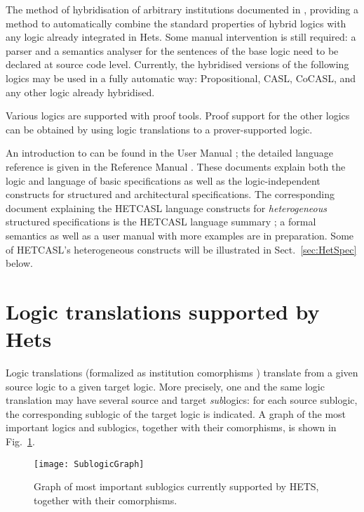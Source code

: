 \documentclass{article}
\newcommand{\normalTEXTSC}[2]{{#1\scriptsize#2}}
\newcommand     {\Hets}{\normalTEXTSC{H}{ETS}\xspace}
\newcommand{\HetCASL}{\normalTEXTSC{H}{ET}\normalTEXTSC{C}{ASL}\xspace}
\begin{document}
\begin{description}
The method of hybridisation of arbitrary institutions documented in \cite{DBLP:conf/calco/MartinsMDB11}, providing a method to automatically
combine the standard properties of hybrid logics with any logic already integrated in Hets.
Some manual intervention is still required: a parser and a semantics analyser for the sentences of the base
logic need to be declared at source code level.
Currently, the hybridised versions of the following logics may be used in a fully automatic way:
Propositional, CASL, CoCASL, and any other logic already hybridised.
\end{description}

Various logics are supported with proof tools. Proof support for the
other logics can be obtained by using logic translations to a
prover-supported logic.


An introduction to \CASL can be found in the \CASL User Manual
\cite{CASL-UM}; the detailed language reference is given in
the \CASL Reference Manual \cite{CASL/RefManual}.  These documents
explain both the \CASL logic and language of basic specifications as
well as the logic-independent constructs for structured and
architectural specifications.  The corresponding document explaining the
\HetCASL language constructs for \emph{heterogeneous} structured specifications
is the \HetCASL language summary \cite{Mossakowski04}; a formal
semantics as well as a user manual with more examples are in preparation.
Some of \HetCASL's heterogeneous constructs will be illustrated
in Sect.~\ref{sec:HetSpec} below.

\section{Logic translations supported
by Hets}
\label{comorphisms}

Logic translations (formalized as institution comorphisms
\cite{GoguenRosu02}) translate from a given source logic to a given
target logic. More precisely, one and the same logic translation
may have several source and target \emph{sub}logics: for
each source sublogic, the corresponding sublogic of the target
logic is indicated.
A graph of the most important logics and sublogics, together with their
comorphisms, is shown in Fig.~\ref{fig:SublogicGraph}.

\begin{figure}
  \begin{center}
    \texttt{[image: SublogicGraph]}
  \end{center}
\caption{Graph of most important sublogics currently supported by \Hets,
together with their comorphisms.}
\label{fig:SublogicGraph}
\end{figure}
\end{document}
